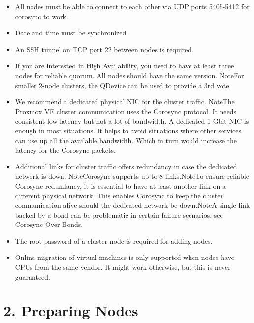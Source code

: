 \begin{itemize}[leftmargin=2cm]

	\item All nodes must be able to connect to each other via UDP ports 5405-5412 for corosync to work.

	\item Date and time must be synchronized.

	\item An SSH tunnel on TCP port 22 between nodes is required.

	\item If you are interested in High Availability, you need to have at least three nodes for reliable quorum. All nodes should have the same version. NoteFor smaller 2-node clusters, the QDevice can be used to provide a 3rd vote.

	\item We recommend a dedicated physical NIC for the cluster traffic. NoteThe Proxmox VE cluster communication uses the Corosync protocol. It needs consistent low latency but not a lot of bandwidth. A dedicated 1 Gbit NIC is enough in most situations. It helps to avoid situations where other services can use up all the available bandwidth. Which in turn would increase the latency for the Corosync packets.

	\item Additional links for cluster traffic offers redundancy in case the dedicated network is down. NoteCorosync supports up to 8 links.NoteTo ensure reliable Corosync redundancy, it is essential to have at least another link on a different physical network. This enables Corosync to keep the cluster communication alive should the dedicated network be down.NoteA single link backed by a bond can be problematic in certain failure scenarios, see Corosync Over Bonds.

	\item The root password of a cluster node is required for adding nodes.

	\item Online migration of virtual machines is only supported when nodes have CPUs from the same vendor. It might work otherwise, but this is never guaranteed.

\end{itemize}


\section{2. Preparing Nodes}

